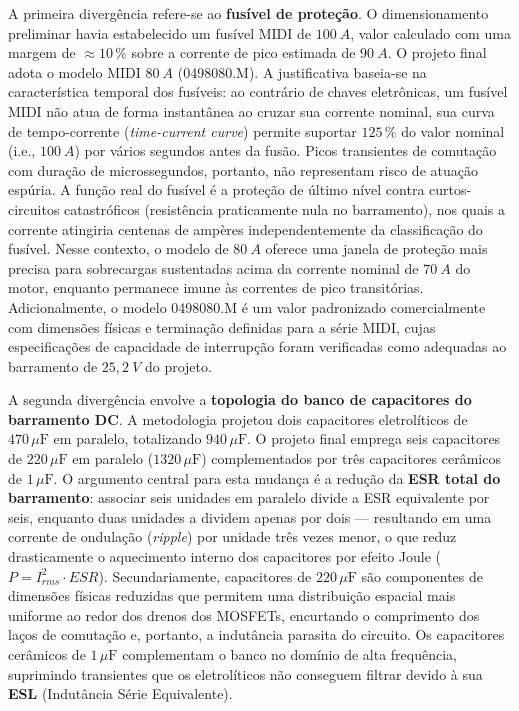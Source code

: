 A primeira divergência refere-se ao \textbf{fusível de proteção}. O dimensionamento preliminar havia estabelecido um fusível MIDI de $100 \: A$, valor calculado com uma margem de ${\approx}10\,\%$ sobre a corrente de pico estimada de $90 \: A$. O projeto final adota o modelo MIDI $80 \: A$ (0498080.M). A justificativa baseia-se na característica temporal dos fusíveis: ao contrário de chaves eletrônicas, um fusível MIDI não atua de forma instantânea ao cruzar sua corrente nominal, sua curva de tempo-corrente (\textit{time-current curve}) permite suportar $125\,\%$ do valor nominal (i.e., $100 \: A$) por vários segundos antes da fusão. Picos transientes de comutação com duração de microssegundos, portanto, não representam risco de atuação espúria. A função real do fusível é a proteção de último nível contra curtos-circuitos catastróficos (resistência praticamente nula no barramento), nos quais a corrente atingiria centenas de ampères independentemente da classificação do fusível. Nesse contexto, o modelo de $80 \: A$ oferece uma janela de proteção mais precisa para sobrecargas sustentadas acima da corrente nominal de $70 \: A$ do motor, enquanto permanece imune às correntes de pico transitórias. Adicionalmente, o modelo 0498080.M é um valor padronizado comercialmente com dimensões físicas e terminação definidas para a série MIDI, cujas especificações de capacidade de interrupção foram verificadas como adequadas ao barramento de $25{,}2 \: V$ do projeto.

A segunda divergência envolve a \textbf{topologia do banco de capacitores do barramento DC}. A metodologia projetou dois capacitores eletrolíticos de $470\,\mu\text{F}$ em paralelo, totalizando $940\,\mu\text{F}$. O projeto final emprega seis capacitores de $220\,\mu\text{F}$ em paralelo ($1320\,\mu\text{F}$) complementados por três capacitores cerâmicos de $1\,\mu\text{F}$. O argumento central para esta mudança é a redução da \textbf{ESR total do barramento}: associar seis unidades em paralelo divide a ESR equivalente por seis, enquanto duas unidades a dividem apenas por dois — resultando em uma corrente de ondulação (\textit{ripple}) por unidade três vezes menor, o que reduz drasticamente o aquecimento interno dos capacitores por efeito Joule ($P = I_{rms}^2 \cdot ESR$). Secundariamente, capacitores de $220\,\mu\text{F}$ são componentes de dimensões físicas reduzidas que permitem uma distribuição espacial mais uniforme ao redor dos drenos dos MOSFETs, encurtando o comprimento dos laços de comutação e, portanto, a indutância parasita do circuito. Os capacitores cerâmicos de $1\,\mu\text{F}$ complementam o banco no domínio de alta frequência, suprimindo transientes que os eletrolíticos não conseguem filtrar devido à sua \textbf{ESL} (Indutância Série Equivalente).

